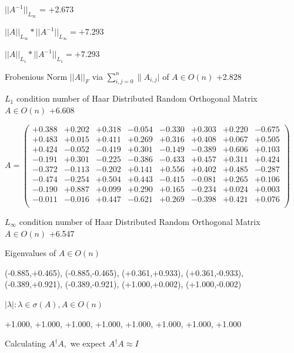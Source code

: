 \documentclass[9pt]{article}
\theoremstyle{plain}
\theoremstyle{definition}
\theoremstyle{remark}
\numberwithin{equation}{section}
\begin{document}
$||A^{-1}||_{L_{\infty}}$ = +2.673

$||A||_{L_{\infty}} * ||A^{-1}||_{L_{\infty}} = +7.293$

$||A||_{L_1} * ||A^{-1}||_{L_1} = +7.293$

Frobenious Norm  $||A||_{\textit{F}}$ via $\sum\limits_{i,j =0}^{n} \|A_{i,j}|$   of  $A \in O(n)$  +2.828

$L_1$ condition number of Haar Distributed Random Orthogonal Matrix $A \in O(n)$ +6.608

$A = \left(
\begin{array}{
cccccccc}
+0.388 & +0.202 & +0.318 & -0.054 & -0.330 & +0.303 & +0.220 & -0.675 \\
+0.483 & +0.015 & +0.411 & +0.269 & +0.316 & +0.408 & +0.067 & +0.505 \\
+0.424 & -0.052 & -0.419 & +0.301 & -0.149 & -0.389 & +0.606 & +0.103 \\
-0.191 & +0.301 & -0.225 & -0.386 & -0.433 & +0.457 & +0.311 & +0.424 \\
-0.372 & -0.113 & -0.202 & +0.141 & +0.556 & +0.402 & +0.485 & -0.287 \\
-0.474 & -0.254 & +0.504 & +0.443 & -0.415 & -0.081 & +0.265 & +0.106 \\
-0.190 & +0.887 & +0.099 & +0.290 & +0.165 & -0.234 & +0.024 & +0.003 \\
-0.011 & -0.016 & +0.447 & -0.621 & +0.269 & -0.398 & +0.421 & +0.076 \\
\end{array}
\right)$ \newline 

$L_{\infty}$ condition number of Haar Distributed Random Orthogonal Matrix $A \in O(n)$ +6.547

Eigenvalues of $A \in O(n)$

(-0.885,+0.465), (-0.885,-0.465), (+0.361,+0.933), (+0.361,-0.933), (-0.389,+0.921), (-0.389,-0.921), (+1.000,+0.002), (+1.000,-0.002)

 $|\lambda | : \lambda \in \sigma(A) , A \in O(n)$

+1.000, +1.000, +1.000, +1.000, +1.000, +1.000, +1.000, +1.000


Calculating $A^{\dag} A,$  we expect $A^{\dag} A \approx I$
\end{document}
